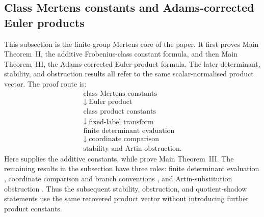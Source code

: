 \documentclass[11pt,a4paper]{amsart}
\theoremstyle{plain}
\theoremstyle{definition}
\theoremstyle{remark}
\begin{document}
\subsection{Class Mertens constants and Adams-corrected Euler products}
\label{subsec:class-mertens-adams-products}

This subsection is the finite-group Mertens core of the paper.  It first
proves Main Theorem~II, the additive Frobenius-class constant formula, and
then Main Theorem~III, the Adams-corrected Euler-product formula.  The later
determinant, stability, and obstruction results all refer to the same
scalar-normalised product vector.  The proof route is:
\[
\begin{array}{c}
  \text{class Mertens constants}\\
  \downarrow\;\text{Euler product}\\
  \text{class product constants}\\
  \downarrow\;\text{fixed-label transform}\\
  \text{finite determinant evaluation}\\
  \downarrow\;\text{coordinate comparison}\\
  \text{stability and Artin obstruction}.
\end{array}
\]
Here  supplies the additive constants, while
 prove
Main Theorem~III.  The remaining results in the subsection have three roles:
finite determinant evaluation
,
coordinate comparison and branch conventions
,
and Artin-substitution obstruction
.  Thus
the subsequent stability, obstruction, and quotient-shadow statements use the
same recovered product vector without introducing further product constants.
\end{document}
